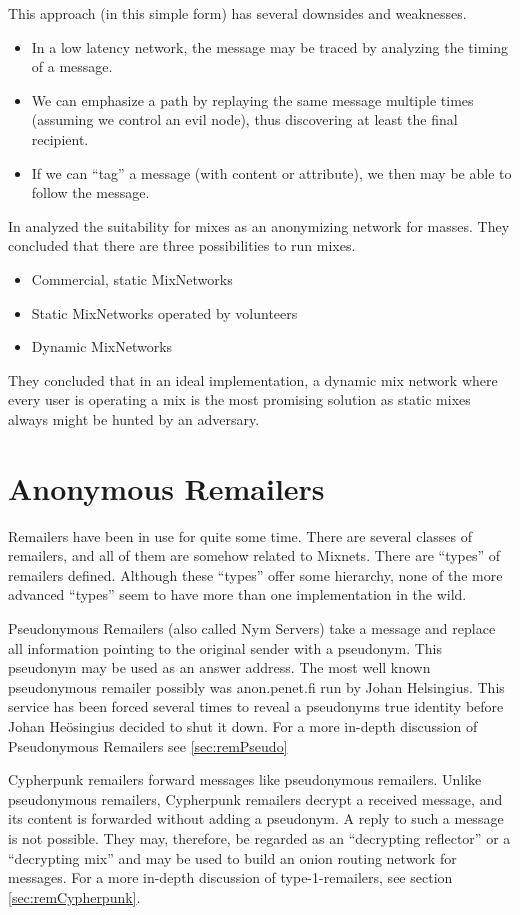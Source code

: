 This approach (in this simple form) has several downsides and weaknesses.

\begin{itemize}
	\item In a low latency network, the message may be traced by analyzing the timing of a message.
	\item We can emphasize a path by replaying the same message multiple times (assuming we control an evil node), thus discovering at least the final recipient.
	\item If we can ``tag'' a message (with content or attribute), we then may be able to follow the message.
\end{itemize}

In \citeyear{RP03-1} \citeauthor{RP03-1} analyzed the suitability for mixes as an anonymizing network for masses. They concluded that there are three possibilities to run mixes.
\begin{itemize}
	\item Commercial, static MixNetworks
	\item Static MixNetworks operated by volunteers
	\item Dynamic MixNetworks
\end{itemize}
They concluded that in an ideal implementation, a dynamic mix network where every user is operating a mix is the most promising solution as static mixes always might be hunted by an adversary.

\section{Anonymous Remailers}
Remailers have been in use for quite some time. There are several classes of remailers, and all of them are somehow related to Mixnets. There are ``types'' of remailers defined. Although these ``types'' offer some hierarchy, none of the more advanced ``types'' seem to have more than one implementation in the wild. 

Pseudonymous Remailers (also called Nym Servers) take a message and replace all information pointing to the original sender with a pseudonym. This pseudonym may be used as an answer address. The most well known pseudonymous remailer possibly was anon.penet.fi run by Johan Helsingius. This service has been forced several times to reveal a pseudonyms true identity before Johan Heösingius decided to shut it down. For a more in-depth discussion of Pseudonymous Remailers see \ref{sec:remPseudo}

Cypherpunk remailers forward messages like pseudonymous remailers. Unlike pseudonymous remailers, Cypherpunk remailers decrypt a received message, and its content is forwarded without adding a pseudonym. A reply to such a message is not possible. They may, therefore, be regarded as an ``decrypting reflector'' or a ``decrypting mix'' and may be used to build an onion routing network for messages. For a more in-depth discussion of type-1-remailers, see section  \ref{sec:remCypherpunk}.

